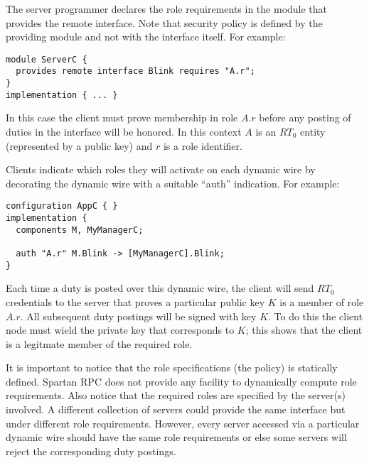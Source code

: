 
The server programmer declares the role requirements in the module that provides the remote
interface. Note that security policy is defined by the providing module and not with the
interface itself. For example:

\begin{verbatim}
module ServerC {
  provides remote interface Blink requires "A.r";
}
implementation { ... }
\end{verbatim}

In this case the client must prove membership in role $A.r$ before any posting of duties in the
interface will be honored. In this context $A$ is an $RT_0$ entity (represented by a public key)
and $r$ is a role identifier.

Clients indicate which roles they will activate on each dynamic wire by decorating the dynamic
wire with a suitable ``auth'' indication. For example:

\begin{verbatim}
configuration AppC { }
implementation {
  components M, MyManagerC;
  
  auth "A.r" M.Blink -> [MyManagerC].Blink;
}
\end{verbatim}

Each time a duty is posted over this dynamic wire, the client will send $RT_0$ credentials to
the server that proves a particular public key $K$ is a member of role $A.r$. All subsequent
duty postings will be signed with key $K$. To do this the client node must wield the private key
that corresponds to $K$; this shows that the client is a legitmate member of the required role.

It is important to notice that the role specifications (the policy) is statically defined.
Spartan RPC does not provide any facility to dynamically compute role requirements. Also notice
that the required roles are specified by the server(s) involved. A different collection of
servers could provide the same interface but under different role requirements. However, every
server accessed via a particular dynamic wire should have the same role requirements or else
some servers will reject the corresponding duty postings.

